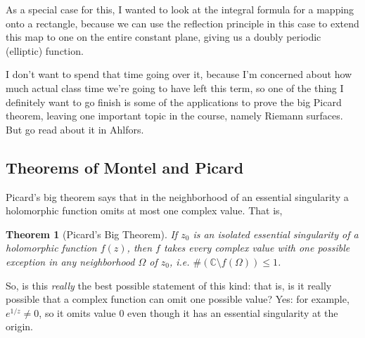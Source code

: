 \documentclass{article}
\newtheorem{theorem}{Theorem}
\newcommand{\mbb}[1]{\mathbb{#1}}
\begin{document}
As a special case for this, I wanted to look at the integral formula for a mapping onto a rectangle, because we can use the reflection principle in this case to extend this map to one on the entire constant plane, giving us a doubly periodic (elliptic) function.

I don't want to spend that time going over it, because I'm concerned about how much actual class time we're going to have left this term, so one of the thing I definitely want to go finish is some of the applications to prove the big Picard theorem, leaving one important topic in the course, namely Riemann surfaces. But go read about it in Ahlfors.


\subsection{Theorems of Montel and Picard}

Picard's big theorem says that in the neighborhood of an essential singularity a holomorphic function omits at most one complex value. That is,
\begin{theorem}[Picard's Big Theorem]
If \(z_0\) is an isolated essential singularity of a holomorphic function \(f(z)\), then \(f\) takes every complex value with one possible exception in any neighborhood \(\Omega\) of \(z_0\), i.e. \(\#(\mbb{C}\setminus f(\Omega)) \leq 1\).
\end{theorem}
So, is this \textit{really} the best possible statement of this kind: that is, is it really possible that a complex function can omit one possible value? Yes: for example, \(e^{1/z} \neq 0\), so it omits value \(0\) even though it has an essential singularity at the origin.
\end{document}
